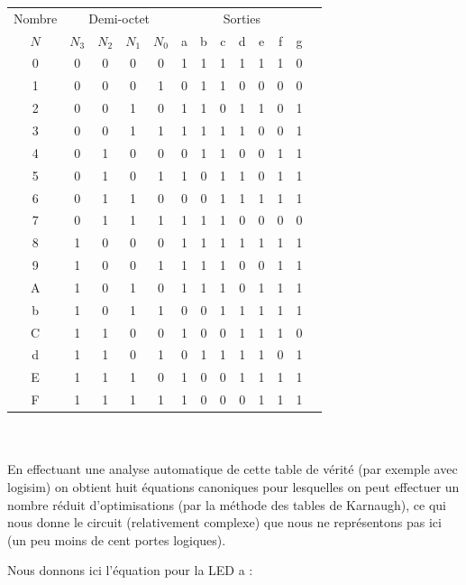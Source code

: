 \documentclass{book}
\theoremstyle{definition}
\theoremstyle{definition}
\begin{document}
 \begin{tabular}{|c||c|c|c|c||c|c|c|c|c|c|c|c|}
    \hline
         Nombre &
         \multicolumn{4}{c||}{Demi-octet}& \multicolumn{7}{c|}{Sorties}\\
        
         $N$ & $N_3$ & $N_2$ & $N_1$ & $N_0$ & a & b & c & d & e & f & g\\
    \hline 
        0 & 0 & 0 & 0 & 0 & 1 & 1 & 1 & 1 & 1 & 1 & 0 \\
        1 & 0 & 0 & 0 & 1 & 0 & 1 & 1 & 0 & 0 & 0 & 0 \\
        2 & 0 & 0 & 1 & 0 & 1 & 1 & 0 & 1 & 1 & 0 & 1 \\
        3 & 0 & 0 & 1 & 1 & 1 & 1 & 1 & 1 & 0 & 0 & 1 \\
    \hline
        4 & 0 & 1 & 0 & 0 & 0 & 1 & 1 & 0 & 0 & 1 & 1 \\
        5 & 0 & 1 & 0 & 1 & 1 & 0 & 1 & 1 & 0 & 1 & 1 \\
        6 & 0 & 1 & 1 & 0 & 0 & 0 & 1 & 1 & 1 & 1 & 1 \\
        7 & 0 & 1 & 1 & 1 & 1 & 1 & 1 & 0 & 0 & 0 & 0 \\
    \hline
        8 & 1 & 0 & 0 & 0 & 1 & 1 & 1 & 1 & 1 & 1 & 1 \\
        9 & 1 & 0 & 0 & 1 & 1 & 1 & 1 & 0 & 0 & 1 & 1 \\
        A & 1 & 0 & 1 & 0 & 1 & 1 & 1 & 0 & 1 & 1 & 1 \\
        b & 1 & 0 & 1 & 1 & 0 & 0 & 1 & 1 & 1 & 1 & 1 \\
    \hline
        C & 1 & 1 & 0 & 0 & 1 & 0 & 0 & 1 & 1 & 1 & 0 \\
        d & 1 & 1 & 0 & 1 & 0 & 1 & 1 & 1 & 1 & 0 & 1 \\
        E & 1 & 1 & 1 & 0 & 1 & 0 & 0 & 1 & 1 & 1 & 1 \\
        F & 1 & 1 & 1 & 1 & 1 & 0 & 0 & 0 & 1 & 1 & 1 \\
    \hline
  \end{tabular}
\\
\\

En effectuant une analyse automatique de cette table de vérité (par exemple avec logisim) on obtient huit équations canoniques pour lesquelles on peut effectuer un nombre réduit d'optimisations (par la méthode des tables de Karnaugh), ce qui nous donne le circuit (relativement complexe) que nous ne représentons pas ici (un peu moins de cent portes logiques).

Nous donnons ici l'équation pour la LED a :
\end{document}
